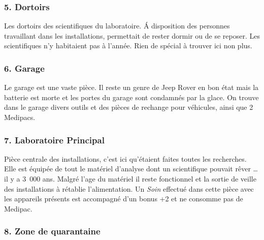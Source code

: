 \subsubsection{5. Dortoirs}
Les dortoirs des scientifiques du laboratoire. \'A disposition des personnes travaillant dans les installations, permettait de rester dormir ou de se reposer. Les scientifiques n’y habitaient pas à l’année. Rien de spécial à trouver ici non plus.

\subsubsection{6. Garage}
Le garage est une vaste pièce. Il reste un genre de Jeep Rover en bon état mais la batterie est morte et les portes du garage sont condamnés par la glace. On trouve dans le garage divers outils et des pièces de rechange pour véhicules, ainsi que 2 Medipacs.

\subsubsection{7. Laboratoire Principal}
Pièce centrale des installations, c’est ici qu’étaient faites toutes les recherches. Elle est équipée de tout le matériel d’analyse dont un scientifique pouvait rêver \ldots il y a 3~000 ans. Malgré l’age du matériel il reste fonctionnel et la sortie de veille des installations à rétablie l’alimentation. Un \textit{Soin} effectué dans cette pièce avec les appareils présents est accompagné d’un bonus +2 et ne consomme pas de Medipac.

\subsubsection{8. Zone de quarantaine}

